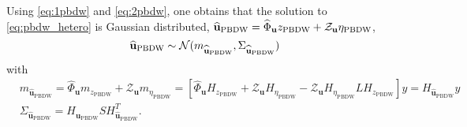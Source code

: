 \begin{rmk}
 Using \eqref{eq:1pbdw} and \eqref{eq:2pbdw}, one obtains that the solution to \eqref{eq:pbdw_hetero} is Gaussian distributed,
 $\widehat{\mathbf u}_{\rm PBDW} = \widehat{\Phi}_{\mathbf u}z_{\text{PBDW}}+\mathcal{Z}_{\mathbf u}\eta_{\text{PBDW}}$,
 \[
 \widehat{\mathbf u}_{\rm PBDW} \sim\mathcal{N}(m_{\widehat{\mathbf u}_{\rm PBDW}}, \Sigma_{\widehat{\mathbf u}_{\rm PBDW}})
 \]
 with 
   \begin{equation}\label{eq:cov}
   \begin{aligned}
       &m_{\widehat{\mathbf{u}}_{\text{PBDW}}} = \widehat{\Phi}_{\mathbf u}  m_{z_{\text{PBDW}}} + \mathcal{Z}_{\mathbf u} m_{\eta_{\text{PBDW}}} = 
 [\widehat{\Phi}_{\mathbf u}  H_{z_{\text{PBDW}}}+\mathcal{Z}_{\mathbf u} H_{\eta_{\text{PBDW}}}-\mathcal{Z}_{\mathbf u} H_{\eta_{\text{PBDW}}}LH_{z_{\text{PBDW}}}]y = H_{\widehat{\mathbf{u}}_{\text{PBDW}}}y  \\
     &\Sigma_{\widehat{\mathbf{u}}_{\text{PBDW}}} = H_{\widehat{\mathbf{u}}_{\text{PBDW}}}S H_{\widehat{\mathbf{u}}_{\text{PBDW}}}^T.
   \end{aligned}
   \end{equation}
\end{rmk}

